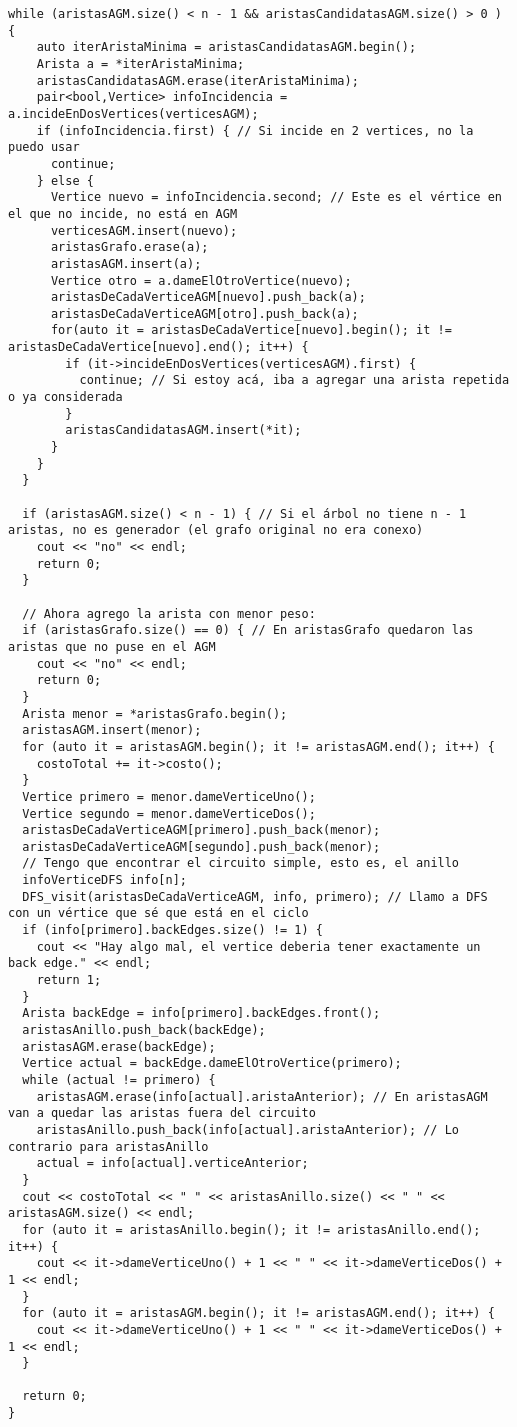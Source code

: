 \begin{lstlisting}[frame=single]
  while (aristasAGM.size() < n - 1 && aristasCandidatasAGM.size() > 0 ) {
    auto iterAristaMinima = aristasCandidatasAGM.begin();
    Arista a = *iterAristaMinima;
    aristasCandidatasAGM.erase(iterAristaMinima);
    pair<bool,Vertice> infoIncidencia = a.incideEnDosVertices(verticesAGM);
    if (infoIncidencia.first) { // Si incide en 2 vertices, no la puedo usar
      continue;
    } else {
      Vertice nuevo = infoIncidencia.second; // Este es el vértice en el que no incide, no está en AGM
      verticesAGM.insert(nuevo); 
      aristasGrafo.erase(a);
      aristasAGM.insert(a); 
      Vertice otro = a.dameElOtroVertice(nuevo);
      aristasDeCadaVerticeAGM[nuevo].push_back(a); 
      aristasDeCadaVerticeAGM[otro].push_back(a);
      for(auto it = aristasDeCadaVertice[nuevo].begin(); it != aristasDeCadaVertice[nuevo].end(); it++) {
        if (it->incideEnDosVertices(verticesAGM).first) {
          continue; // Si estoy acá, iba a agregar una arista repetida o ya considerada
        }
        aristasCandidatasAGM.insert(*it);
      }
    }
  }
  
  if (aristasAGM.size() < n - 1) { // Si el árbol no tiene n - 1 aristas, no es generador (el grafo original no era conexo)
    cout << "no" << endl;
    return 0;
  }
  
  // Ahora agrego la arista con menor peso:
  if (aristasGrafo.size() == 0) { // En aristasGrafo quedaron las aristas que no puse en el AGM
    cout << "no" << endl;
    return 0;
  }
  Arista menor = *aristasGrafo.begin();
  aristasAGM.insert(menor);
  for (auto it = aristasAGM.begin(); it != aristasAGM.end(); it++) {
    costoTotal += it->costo();
  }
  Vertice primero = menor.dameVerticeUno();
  Vertice segundo = menor.dameVerticeDos();
  aristasDeCadaVerticeAGM[primero].push_back(menor);
  aristasDeCadaVerticeAGM[segundo].push_back(menor);
  // Tengo que encontrar el circuito simple, esto es, el anillo
  infoVerticeDFS info[n];
  DFS_visit(aristasDeCadaVerticeAGM, info, primero); // Llamo a DFS con un vértice que sé que está en el ciclo
  if (info[primero].backEdges.size() != 1) {
    cout << "Hay algo mal, el vertice deberia tener exactamente un back edge." << endl;
    return 1;
  }
  Arista backEdge = info[primero].backEdges.front();
  aristasAnillo.push_back(backEdge);
  aristasAGM.erase(backEdge);
  Vertice actual = backEdge.dameElOtroVertice(primero);
  while (actual != primero) {
    aristasAGM.erase(info[actual].aristaAnterior); // En aristasAGM van a quedar las aristas fuera del circuito
    aristasAnillo.push_back(info[actual].aristaAnterior); // Lo contrario para aristasAnillo
    actual = info[actual].verticeAnterior;
  }
  cout << costoTotal << " " << aristasAnillo.size() << " " << aristasAGM.size() << endl;
  for (auto it = aristasAnillo.begin(); it != aristasAnillo.end(); it++) {
    cout << it->dameVerticeUno() + 1 << " " << it->dameVerticeDos() + 1 << endl;
  }
  for (auto it = aristasAGM.begin(); it != aristasAGM.end(); it++) {
    cout << it->dameVerticeUno() + 1 << " " << it->dameVerticeDos() + 1 << endl;
  }
  
  return 0;
}
\end{lstlisting}

